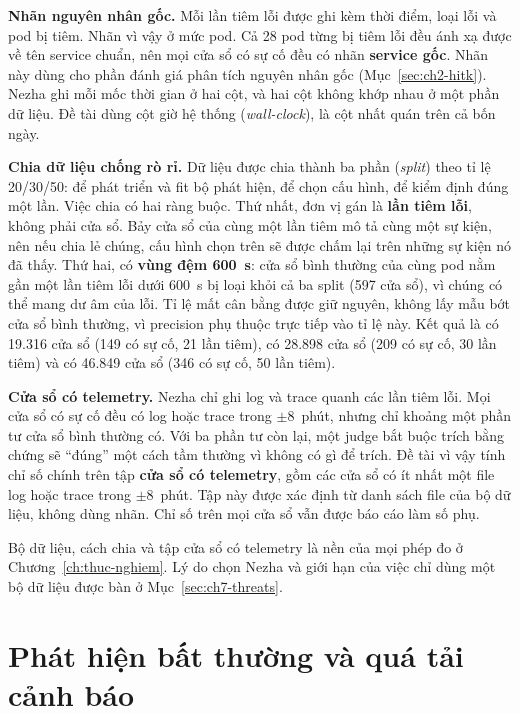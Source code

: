 \textbf{Nhãn nguyên nhân gốc.} Mỗi lần tiêm lỗi được ghi kèm thời điểm, loại lỗi và pod bị tiêm. Nhãn vì vậy ở mức pod. Cả 28 pod từng bị tiêm lỗi đều ánh xạ được về tên service chuẩn, nên mọi cửa sổ có sự cố đều có nhãn \textbf{service gốc}. Nhãn này dùng cho phần đánh giá phân tích nguyên nhân gốc (Mục~\ref{sec:ch2-hitk}). Nezha ghi mỗi mốc thời gian ở hai cột, và hai cột không khớp nhau ở một phần dữ liệu. Đề tài dùng cột giờ hệ thống (\emph{wall-clock}), là cột nhất quán trên cả bốn ngày.

\textbf{Chia dữ liệu chống rò rỉ.} Dữ liệu được chia thành ba phần (\emph{split}) theo tỉ lệ 20/30/50:  để phát triển và fit bộ phát hiện,  để chọn cấu hình,  để kiểm định đúng một lần. Việc chia có hai ràng buộc. Thứ nhất, đơn vị gán là \textbf{lần tiêm lỗi}, không phải cửa sổ. Bảy cửa sổ của cùng một lần tiêm mô tả cùng một sự kiện, nên nếu chia lẻ chúng, cấu hình chọn trên  sẽ được chấm lại trên những sự kiện nó đã thấy. Thứ hai, có \textbf{vùng đệm 600~s}: cửa sổ bình thường của cùng pod nằm gần một lần tiêm lỗi dưới 600~s bị loại khỏi cả ba split (597 cửa sổ), vì chúng có thể mang dư âm của lỗi. Tỉ lệ mất cân bằng được giữ nguyên, không lấy mẫu bớt cửa sổ bình thường, vì precision phụ thuộc trực tiếp vào tỉ lệ này. Kết quả là  có 19.316 cửa sổ (149 có sự cố, 21 lần tiêm),  có 28.898 cửa sổ (209 có sự cố, 30 lần tiêm) và  có 46.849 cửa sổ (346 có sự cố, 50 lần tiêm).

\textbf{Cửa sổ có telemetry.} Nezha chỉ ghi log và trace quanh các lần tiêm lỗi. Mọi cửa sổ có sự cố đều có log hoặc trace trong $\pm 8$~phút, nhưng chỉ khoảng một phần tư cửa sổ bình thường có. Với ba phần tư còn lại, một judge bắt buộc trích bằng chứng sẽ ``đúng'' một cách tầm thường vì không có gì để trích. Đề tài vì vậy tính chỉ số chính trên tập \textbf{cửa sổ có telemetry}, gồm các cửa sổ có ít nhất một file log hoặc trace trong $\pm 8$~phút. Tập này được xác định từ danh sách file của bộ dữ liệu, không dùng nhãn. Chỉ số trên mọi cửa sổ vẫn được báo cáo làm số phụ.

Bộ dữ liệu, cách chia và tập cửa sổ có telemetry là nền của mọi phép đo ở Chương~\ref{ch:thuc-nghiem}. Lý do chọn Nezha và giới hạn của việc chỉ dùng một bộ dữ liệu được bàn ở Mục~\ref{sec:ch7-threats}.

\section{Phát hiện bất thường và quá tải cảnh báo}
\label{sec:ch2-phat-hien}

